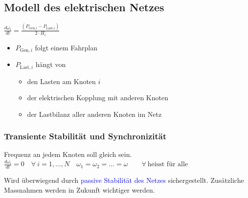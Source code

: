 \subsection{Modell des elektrischen Netzes}
    \begin{minipage}[t]{0.35\columnwidth}
        \centering \vspace{-0.7\baselineskip}
        $\boxed{\frac{d\omega_i}{dt} = \frac{(P_{\text{Gen,}i} - P_{\text{Last,}i})}{2 \cdot H_i} }$
    \end{minipage}%
    \hfill
    \begin{minipage}[t]{0.64\columnwidth}
        \begin{itemize}
            \item \( P_{\text{Gen},i} \) folgt einem Fahrplan
            \item \( P_{\text{Last},i} \) hängt von
            \begin{itemize}
                \item den Lasten am Knoten \( i \)
                \item der elektrischen Kopplung mit anderen Knoten
                \item der Lastbilanz aller anderen Knoten im Netz
            \end{itemize}
        \end{itemize}
    \end{minipage}

\subsubsection{Transiente Stabilität und Synchronizität}
    Frequenz an jedem Knoten soll gleich sein.\\
    $
    \boxed{\frac{d\omega_i}{dt} = 0} 
    \quad 
    \forall \ i = 1, \ldots, N
    \quad
    \boxed{\omega_1 = \omega_2 = \ldots = \omega}
    \quad
    \quad
    \forall \ \text{heisst für alle}
    $

    Wird überwiegend durch \textcolor{blue}{passive Stabilität des Netzes} sichergestellt. Zusätzliche Massnahmen werden in Zukunft wichtiger werden.

